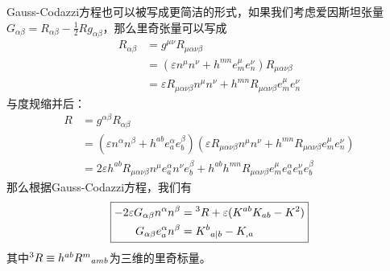 \documentclass[hyperref, UTF8, a4paper]{ctexart}
\begin{document}
Gauss-Codazzi方程也可以被写成更简洁的形式，如果我们考虑爱因斯坦张量$G_{\alpha \beta } =R_{\alpha \beta } -\frac{1}{2} Rg_{\alpha \beta }$，那么里奇张量可以写成
\begin{equation*}
	\begin{aligned}
		R_{\alpha \beta } & =g^{\mu \nu } R_{\mu \alpha \nu \beta }\\
		& =(\varepsilon n^{\mu } n^{\nu } +h^{mn} e_{m}^{\mu } e_{n}^{\nu } )R_{\mu \alpha \nu \beta }\\
		& =\varepsilon R_{\mu \alpha \nu \beta } n^{\mu } n^{\nu } +h^{mn} R_{\mu \alpha \nu \beta } e_{m}^{\mu } e_{n}^{\nu }
	\end{aligned}
\end{equation*}
与度规缩并后：
\begin{equation}
	\begin{aligned}
		R & =g^{\alpha \beta } R_{\alpha \beta }\\
		& =(\varepsilon n^{\alpha } n^{\beta } +h^{ab} e_{a}^{\alpha } e_{b}^{\beta } )(\varepsilon R_{\mu \alpha \nu \beta } n^{\mu } n^{\nu } +h^{mn} R_{\mu \alpha \nu \beta } e_{m}^{\mu } e_{n}^{\nu } )\\
		& =2\varepsilon h^{ab} R_{\mu \alpha \nu \beta } n^{\mu } e_{a}^{\alpha } n^{\nu } e_{b}^{\beta } +h^{ab} h^{mn} R_{\mu \alpha \nu \beta } e_{m}^{\mu } e_{a}^{\alpha } e_{n}^{\nu } e_{b}^{\beta }
	\end{aligned}
	\label{ricci scalar expended}
\end{equation}
那么根据Gauss-Codazzi方程，我们有
\begin{equation*}
	\boxed{\begin{aligned}
			-2\varepsilon G_{\alpha \beta } n^{\alpha } n^{\beta } & =\prescript{3}{}{} R+\varepsilon (K^{ab} K_{ab} -K^{2} )\\
			G_{\alpha \beta } e_{a}^{\alpha } n^{\beta } & =K^{b}{}_{a|b} -K_{,a}
	\end{aligned}}
\end{equation*}
其中$\prescript{3}{}{} R\equiv h^{ab} R^{m}{}_{amb}$为三维的里奇标量。
\end{document}
